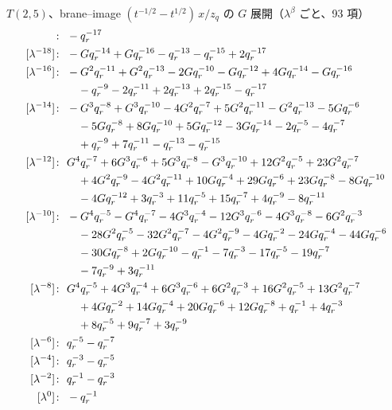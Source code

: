 $T(2,5)$、brane--image $(t^{-1/2} - t^{1/2})\,x/z_q$ の $G$ 展開（$\lambda^\beta$ ごと、93 項）
\begin{align*}
[\lambda^{-20}]\colon\ & -\qr^{-17} \\
[\lambda^{-18}]\colon\ & -G \qr^{-14} +G \qr^{-16} -\qr^{-13} -\qr^{-15} +2 \qr^{-17} \\
[\lambda^{-16}]\colon\ & -G^{2} \qr^{-11} +G^{2} \qr^{-13} -2 G \qr^{-10} -G \qr^{-12} +4 G \qr^{-14} -G \qr^{-16} \\
& \quad -\qr^{-9} -2 \qr^{-11} +2 \qr^{-13} +2 \qr^{-15} -\qr^{-17} \\
[\lambda^{-14}]\colon\ & -G^{3} \qr^{-8} +G^{3} \qr^{-10} -4 G^{2} \qr^{-7} +5 G^{2} \qr^{-11} -G^{2} \qr^{-13} -5 G \qr^{-6} \\
& \quad -5 G \qr^{-8} +8 G \qr^{-10} +5 G \qr^{-12} -3 G \qr^{-14} -2 \qr^{-5} -4 \qr^{-7} \\
& \quad +\qr^{-9} +7 \qr^{-11} -\qr^{-13} -\qr^{-15} \\
[\lambda^{-12}]\colon\ & G^{4} \qr^{-7} +6 G^{3} \qr^{-6} +5 G^{3} \qr^{-8} -G^{3} \qr^{-10} +12 G^{2} \qr^{-5} +23 G^{2} \qr^{-7} \\
& \quad +4 G^{2} \qr^{-9} -4 G^{2} \qr^{-11} +10 G \qr^{-4} +29 G \qr^{-6} +23 G \qr^{-8} -8 G \qr^{-10} \\
& \quad -4 G \qr^{-12} +3 \qr^{-3} +11 \qr^{-5} +15 \qr^{-7} +4 \qr^{-9} -8 \qr^{-11} \\
[\lambda^{-10}]\colon\ & -G^{4} \qr^{-5} -G^{4} \qr^{-7} -4 G^{3} \qr^{-4} -12 G^{3} \qr^{-6} -4 G^{3} \qr^{-8} -6 G^{2} \qr^{-3} \\
& \quad -28 G^{2} \qr^{-5} -32 G^{2} \qr^{-7} -4 G^{2} \qr^{-9} -4 G \qr^{-2} -24 G \qr^{-4} -44 G \qr^{-6} \\
& \quad -30 G \qr^{-8} +2 G \qr^{-10} -\qr^{-1} -7 \qr^{-3} -17 \qr^{-5} -19 \qr^{-7} \\
& \quad -7 \qr^{-9} +3 \qr^{-11} \\
[\lambda^{-8}]\colon\ & G^{4} \qr^{-5} +4 G^{3} \qr^{-4} +6 G^{3} \qr^{-6} +6 G^{2} \qr^{-3} +16 G^{2} \qr^{-5} +13 G^{2} \qr^{-7} \\
& \quad +4 G \qr^{-2} +14 G \qr^{-4} +20 G \qr^{-6} +12 G \qr^{-8} +\qr^{-1} +4 \qr^{-3} \\
& \quad +8 \qr^{-5} +9 \qr^{-7} +3 \qr^{-9} \\
[\lambda^{-6}]\colon\ & \qr^{-5} -\qr^{-7} \\
[\lambda^{-4}]\colon\ & \qr^{-3} -\qr^{-5} \\
[\lambda^{-2}]\colon\ & \qr^{-1} -\qr^{-3} \\
[\lambda^{0}]\colon\ & -\qr^{-1}
\end{align*}

